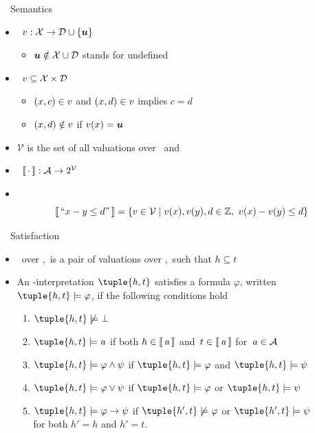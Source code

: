 \begin{frame}{\HTC\ \ Semantics}
  \begin{itemize}
  \item {} \ $v: \mathcal{X} \rightarrow {\ensuremath{\mathcal{D}}\cup \{\ensuremath{\boldsymbol{u}}\}}$
    \begin{itemize}
    \item $\boldsymbol{u} \notin \mathcal{X} \cup \mathcal{D}$ stands for undefined
    \end{itemize}
  \item<2->[]  \ $v \subseteq \mathcal{X} \times \mathcal{D}$
    \begin{itemize}
    \item $(x,c)\in v$ and $(x,d)\in v$ implies $c = d$
    \item $(x,d)\notin v$ if $v(x)=\boldsymbol{u}$
    \end{itemize}
  \item<2->[] $\mathcal{V}$ is the set of all valuations over \Variables\ and \Domain\
    \medskip
  \item<3->  \ $\llbracket \, \cdot \, \rrbracket: \mathcal{A} \rightarrow 2^{\mathcal{V}}$
    \smallskip
  \item<4->  \
    \[
    \llbracket \, \text{``}{x - y \leq d}\text{''} \, \rrbracket
    =
    \{v\in\mathcal{V}\mid v(x),v(y), d \in \mathbb{Z}, \ v(x)-v(y)\leq d\}
    \]
  \end{itemize}
\end{frame}
\begin{frame}{\HTC\ \ Satisfaction}
  \medskip
  \begin{itemize}
  \item {} \ over \Variables,\Domain\ is a pair 
    of valuations over \Variables,\Domain\ such that $h\subseteq t$
    \bigskip
  \item<2-> An \HTC-interpretation $\tuple{h,t}$ satisfies a formula $\varphi$,
    written $\tuple{h,t} \models \varphi$, if the following conditions hold
    \begin{enumerate}\normalsize
    \item $\tuple{h,t} \not\models \bot$
    \item $\tuple{h,t} \models \ThAt$ if both $h \in \llbracket \, \mathit{a} \, \rrbracket$ and~$t \in \llbracket \, \mathit{a} \, \rrbracket$ for~$\mathit{a} \in \mathcal{A}$
    \item $\tuple{h,t} \models \varphi \wedge \psi$ if $\tuple{h,t} \models \varphi$ and $\tuple{h,t} \models \psi$
    \item $\tuple{h,t} \models \varphi \vee \psi$ if $\tuple{h,t} \models \varphi$ or $\tuple{h,t} \models \psi$
    \item $\tuple{h,t} \models \varphi \to \psi$ if $\tuple{h',t} \not\models \varphi$ or $\tuple{h',t} \models \psi$
      \\ for both $h' = h$ and $h' = t$.
    \end{enumerate}
  \end{itemize}
\end{frame}
